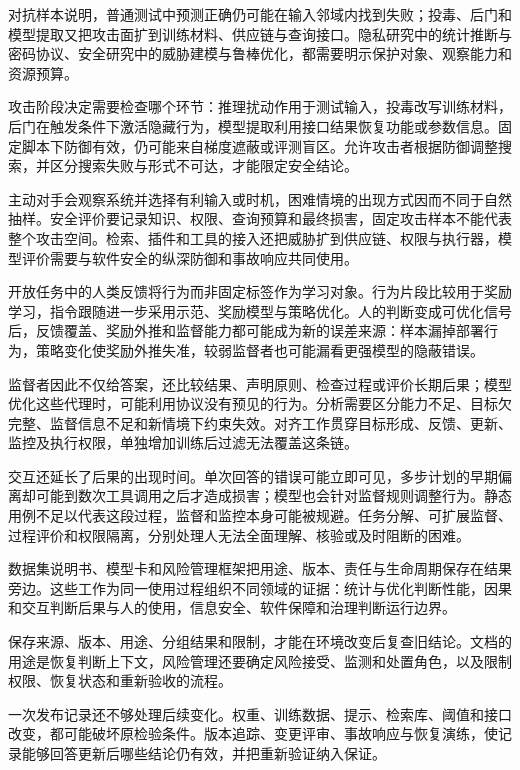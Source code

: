 对抗样本说明，普通测试中预测正确仍可能在输入邻域内找到失败；投毒、后门和模型提取又把攻击面扩到训练材料、供应链与查询接口。隐私研究中的统计推断与密码协议、安全研究中的威胁建模与鲁棒优化，都需要明示保护对象、观察能力和资源预算。

攻击阶段决定需要检查哪个环节：推理扰动作用于测试输入，投毒改写训练材料，后门在触发条件下激活隐藏行为，模型提取利用接口结果恢复功能或参数信息。固定脚本下防御有效，仍可能来自梯度遮蔽或评测盲区。允许攻击者根据防御调整搜索，并区分搜索失败与形式不可达，才能限定安全结论。

主动对手会观察系统并选择有利输入或时机，困难情境的出现方式因而不同于自然抽样。安全评价要记录知识、权限、查询预算和最终损害，固定攻击样本不能代表整个攻击空间。检索、插件和工具的接入还把威胁扩到供应链、权限与执行器，模型评价需要与软件安全的纵深防御和事故响应共同使用。

开放任务中的人类反馈将行为而非固定标签作为学习对象。行为片段比较用于奖励学习，指令跟随进一步采用示范、奖励模型与策略优化。人的判断变成可优化信号后，反馈覆盖、奖励外推和监督能力都可能成为新的误差来源：样本漏掉部署行为，策略变化使奖励外推失准，较弱监督者也可能漏看更强模型的隐蔽错误。

监督者因此不仅给答案，还比较结果、声明原则、检查过程或评价长期后果；模型优化这些代理时，可能利用协议没有预见的行为。分析需要区分能力不足、目标欠完整、监督信息不足和新情境下约束失效。对齐工作贯穿目标形成、反馈、更新、监控及执行权限，单独增加训练后过滤无法覆盖这条链。

交互还延长了后果的出现时间。单次回答的错误可能立即可见，多步计划的早期偏离却可能到数次工具调用之后才造成损害；模型也会针对监督规则调整行为。静态用例不足以代表这段过程，监督和监控本身可能被规避。任务分解、可扩展监督、过程评价和权限隔离，分别处理人无法全面理解、核验或及时阻断的困难。

数据集说明书、模型卡和风险管理框架把用途、版本、责任与生命周期保存在结果旁边。这些工作为同一使用过程组织不同领域的证据：统计与优化判断性能，因果和交互判断后果与人的使用，信息安全、软件保障和治理判断运行边界。

保存来源、版本、用途、分组结果和限制，才能在环境改变后复查旧结论。文档的用途是恢复判断上下文，风险管理还要确定风险接受、监测和处置角色，以及限制权限、恢复状态和重新验收的流程。

一次发布记录还不够处理后续变化。权重、训练数据、提示、检索库、阈值和接口改变，都可能破坏原检验条件。版本追踪、变更评审、事故响应与恢复演练，使记录能够回答更新后哪些结论仍有效，并把重新验证纳入保证。

